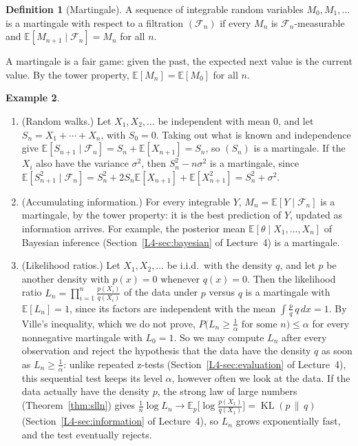 \documentclass[11pt]{article}
\newcommand{\E}{\mathbb{E}}
\DeclareMathOperator{\KL}{KL}
\theoremstyle{definition}
\newtheorem{definition}{Definition}[section]
\newtheorem{example}[definition]{Example}
\theoremstyle{plain}
\theoremstyle{remark}
\begin{document}
\begin{definition}[Martingale]\label{def:martingale}
    A sequence of integrable random variables $M_0, M_1, \ldots$ is a martingale with respect to a filtration $(\mathcal{F}_n)$ if every $M_n$ is $\mathcal{F}_n$-measurable and $\E[M_{n+1} \mid \mathcal{F}_n] = M_n$ for all $n$.
\end{definition}

A martingale is a fair game: given the past, the expected next value is the current value. By the tower property, $\E[M_n] = \E[M_0]$ for all $n$.

\begin{example}\label{ex:martingales}
    \begin{enumerate}
        \item (Random walks.) Let $X_1, X_2, \ldots$ be independent with mean $0$, and let $S_n = X_1 + \cdots + X_n$, with $S_0 = 0$. Taking out what is known and independence give $\E[S_{n+1} \mid \mathcal{F}_n] = S_n + \E[X_{n+1}] = S_n$, so $(S_n)$ is a martingale. If the $X_i$ also have the variance $\sigma^2$, then $S_n^2 - n\sigma^2$ is a martingale, since $\E[S_{n+1}^2 \mid \mathcal{F}_n] = S_n^2 + 2S_n\E[X_{n+1}] + \E[X_{n+1}^2] = S_n^2 + \sigma^2$.
        \item (Accumulating information.) For every integrable $Y$, $M_n = \E[Y \mid \mathcal{F}_n]$ is a martingale, by the tower property: it is the best prediction of $Y$, updated as information arrives. For example, the posterior mean $\E[\theta \mid X_1, \ldots, X_n]$ of Bayesian inference (Section~\ref{L4-sec:bayesian} of Lecture~4) is a martingale.
        \item (Likelihood ratios.) Let $X_1, X_2, \ldots$ be i.i.d.\ with the density $q$, and let $p$ be another density with $p(x) = 0$ whenever $q(x) = 0$. Then the likelihood ratio $L_n = \prod_{i=1}^n \frac{p(X_i)}{q(X_i)}$ of the data under $p$ versus $q$ is a martingale with $\E[L_n] = 1$, since its factors are independent with the mean $\int \frac{p}{q}\,q\, dx = 1$. By Ville's inequality, which we do not prove, $P\big(L_n \geq \frac{1}{\alpha} \text{ for some } n\big) \leq \alpha$ for every nonnegative martingale with $L_0 = 1$. So we may compute $L_n$ after every observation and reject the hypothesis that the data have the density $q$ as soon as $L_n \geq \frac{1}{\alpha}$: unlike repeated z-tests (Section~\ref{L4-sec:evaluation} of Lecture~4), this sequential test keeps its level $\alpha$, however often we look at the data. If the data actually have the density $p$, the strong law of large numbers (Theorem~\ref{thm:slln}) gives $\frac{1}{n}\log L_n \to \E_p\big[\log\frac{p(X_1)}{q(X_1)}\big] = \KL(p \,\|\, q)$ (Section~\ref{L4-sec:information} of Lecture~4), so $L_n$ grows exponentially fast, and the test eventually rejects.
    \end{enumerate}
\end{example}
\end{document}

